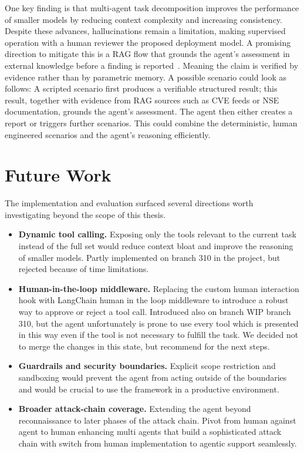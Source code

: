 One key finding is that multi-agent task decomposition improves the performance of smaller models by reducing context complexity and increasing consistency.
Despite these advances, hallucinations remain a limitation, making supervised operation with a human reviewer the proposed deployment model.
A promising direction to mitigate this is a \gls{RAG} flow that grounds the agent's assessment in external knowledge before a finding is reported~\cite{lewis2020rag}.
Meaning the claim is verified by evidence rather than by parametric memory.
A possible scenario could look as follows:
A scripted scenario first produces a verifiable structured result; this result, together with evidence from \gls{RAG} sources such as \gls{CVE} feeds or \gls{NSE} documentation, grounds the agent's assessment.
The agent then either creates a report or triggers further scenarios.
This could combine the deterministic, human engineered scenarios and the agent's reasoning efficiently.

\section{Future Work}\label{sec:future-work}

The implementation and evaluation surfaced several directions worth investigating beyond the scope of this thesis.

\begin{itemize}
    \item \textbf{Dynamic tool calling.}
    Exposing only the tools relevant to the current task instead of the full set would reduce context bloat and improve the reasoning of smaller models.
    Partly implemented on branch 310 in the project, but rejected because of time limitations.

    \item \textbf{Human-in-the-loop middleware.}
    Replacing the custom human interaction hook with \gls{LangChain} human in the loop middleware to introduce a robust way to approve or reject a tool call.
    Introduced also on branch WIP branch 310, but the agent unfortunately is prone to use every tool which is presented in this way even if the tool is not necessary to fulfill the task.
    We decided not to merge the changes in this state, but recommend for the next steps.

    \item \textbf{Guardrails and security boundaries.}
    Explicit scope restriction and sandboxing would prevent the agent from acting outside of the boundaries and would be crucial to use the framework in a productive environment.

    \item \textbf{Broader attack-chain coverage.}
    Extending the agent beyond reconnaissance to later phases of the attack chain.
    Pivot from human against agent to human enhancing multi agents that build a sophisticated attack chain with switch from human implementation to agentic support seamlessly.
\end{itemize}
